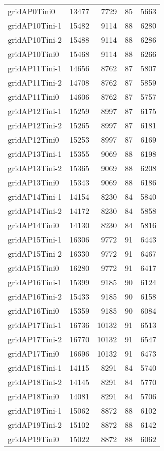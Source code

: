 \begin{longtable}{lrrrr}
gridAP0Tini0 & 13477 & 7729 & 85 & 5663 \\
gridAP10Tini-1 & 15482 & 9114 & 88 & 6280 \\
gridAP10Tini-2 & 15488 & 9114 & 88 & 6286 \\
gridAP10Tini0 & 15468 & 9114 & 88 & 6266 \\
gridAP11Tini-1 & 14656 & 8762 & 87 & 5807 \\
gridAP11Tini-2 & 14708 & 8762 & 87 & 5859 \\
gridAP11Tini0 & 14606 & 8762 & 87 & 5757 \\
gridAP12Tini-1 & 15259 & 8997 & 87 & 6175 \\
gridAP12Tini-2 & 15265 & 8997 & 87 & 6181 \\
gridAP12Tini0 & 15253 & 8997 & 87 & 6169 \\
gridAP13Tini-1 & 15355 & 9069 & 88 & 6198 \\
gridAP13Tini-2 & 15365 & 9069 & 88 & 6208 \\
gridAP13Tini0 & 15343 & 9069 & 88 & 6186 \\
gridAP14Tini-1 & 14154 & 8230 & 84 & 5840 \\
gridAP14Tini-2 & 14172 & 8230 & 84 & 5858 \\
gridAP14Tini0 & 14130 & 8230 & 84 & 5816 \\
gridAP15Tini-1 & 16306 & 9772 & 91 & 6443 \\
gridAP15Tini-2 & 16330 & 9772 & 91 & 6467 \\
gridAP15Tini0 & 16280 & 9772 & 91 & 6417 \\
gridAP16Tini-1 & 15399 & 9185 & 90 & 6124 \\
gridAP16Tini-2 & 15433 & 9185 & 90 & 6158 \\
gridAP16Tini0 & 15359 & 9185 & 90 & 6084 \\
gridAP17Tini-1 & 16736 & 10132 & 91 & 6513 \\
gridAP17Tini-2 & 16770 & 10132 & 91 & 6547 \\
gridAP17Tini0 & 16696 & 10132 & 91 & 6473 \\
gridAP18Tini-1 & 14115 & 8291 & 84 & 5740 \\
gridAP18Tini-2 & 14145 & 8291 & 84 & 5770 \\
gridAP18Tini0 & 14081 & 8291 & 84 & 5706 \\
gridAP19Tini-1 & 15062 & 8872 & 88 & 6102 \\
gridAP19Tini-2 & 15102 & 8872 & 88 & 6142 \\
gridAP19Tini0 & 15022 & 8872 & 88 & 6062 \\

\end{longtable}

